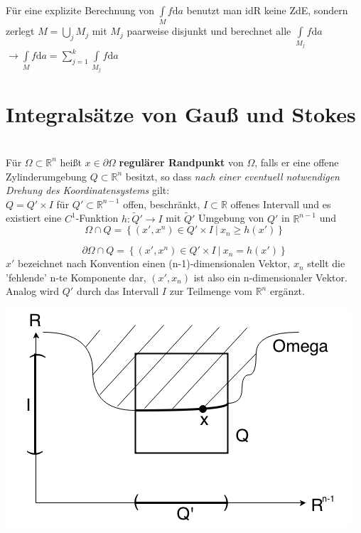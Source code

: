 Für eine explizite Berechnung von $\int\limits_M f \mathrm{d}a $
benutzt man idR keine ZdE, sondern zerlegt 
$M = \bigcup\limits_j M_j $ mit $M_j $ paarweise disjunkt und berechnet alle
$\int\limits_{M_j} f \mathrm{d}a $ \\
$\longrightarrow \int\limits_M f \mathrm{d}a 
= \sum\limits_{j=1}^k \int\limits_{M_j} f \mathrm{d}a $

\section{Integralsätze von Gauß und Stokes}

\begin{definition}
    \mbox{} \\
    Für $\Omega \subset \mathbb{R}^n $ heißt $x \in \partial \Omega $
    \textbf{regulärer Randpunkt} von $\Omega $, falls er eine offene Zylinderumgebung
    $Q \subset \mathbb{R}^n $ besitzt, so dass 
    \emph{nach einer eventuell notwendigen Drehung des Koordinatensystems} gilt:\\
    $Q = Q' \times I $ für $Q' \subset \mathbb{R}^{n-1} $ offen, beschränkt, 
    $I \subset \mathbb{R} $ offenes Intervall und es existiert eine $C^1 $-Funktion
    $h: \tilde{Q}' \rightarrow I $ mit $\tilde{Q}' $ Umgebung von $Q' $
    in $\mathbb{R}^{n-1} $ und \\
    \begin{equation*}
        \Omega \cap Q = 
        \left\lbrace \left(x', x^n \right) \in Q' \times I \ |\ x_n \geq h(x') 
        \right\rbrace
    \end{equation*}        
     
    \begin{equation}
        \partial\Omega \cap Q = 
        \left\lbrace \left(x', x^n \right) \in Q' \times I \ |\ x_n = h(x') \right\rbrace
    \end{equation}
    $x'$ bezeichnet nach Konvention einen (n-1)-dimensionalen Vektor, $x_n$ stellt die
    'fehlende' n-te Komponente dar, $(x', x_n) $ ist also ein n-dimensionaler Vektor.
    Analog wird $Q'$ durch das Intervall $I$ zur Teilmenge vom $\mathbb{R}^n $ ergänzt.
    
    \includegraphics[scale=0.4]{pictures/007-01}
       

\end{definition}
